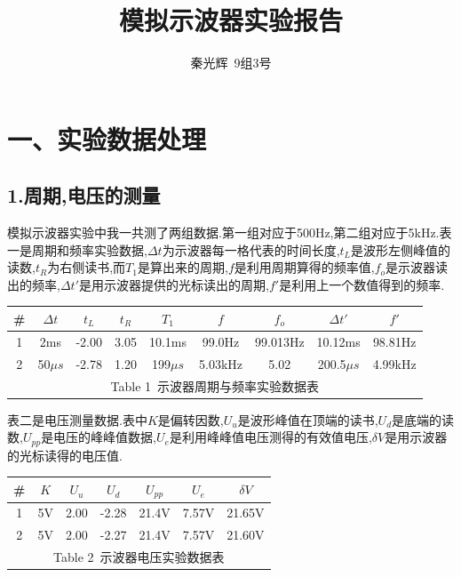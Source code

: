 \documentclass[a4paper,10pt,notitlepage]{report}
\begin{document}
\title{模拟示波器实验报告}
\author{秦光辉\ 9组3号}
\maketitle

\section*{一、实验数据处理}
\subsection*{1.周期,电压的测量}

	模拟示波器实验中我一共测了两组数据.第一组对应于500Hz,第二组对应于5kHz.表一是周期和频率实验数据,$\Delta t$为示波器每一格代表的时间长度,$t_L$是波形左侧峰值的读数,$ t_R $为右侧读书,而$T_1$是算出来的周期,$f$是利用周期算得的频率值,$f_o$是示波器读出的频率,$\Delta t'$是用示波器提供的光标读出的周期,$f'$是利用上一个数值得到的频率. \\
	
\begin{table}[htbp]
\centering
	\begin{tabular}{|c|c|c|c|c|c|c|c|c|}
	
		\hline
		\# & $\Delta t$ & $t_L$ & $ t_R $ & $T_1$ & $f$ & $f_o$ & $\Delta t'$ & $f'$ \\
		\hline
		1 & 2ms & -2.00 & 3.05 & 10.1ms & 99.0Hz & 99.013Hz & 10.12ms & 98.81Hz \\
		\hline
		2 & 50$\mu s$ & -2.78 & 1.20 & 199$\mu s$ & 5.03kHz & 5.02 & 200.5$\mu s$ & 4.99kHz \\
		\hline
		\multicolumn{9}{c}{\scriptsize Table 1\ 示波器周期与频率实验数据表} \\

	\end{tabular}
\end{table}

	表二是电压测量数据.表中$K$是偏转因数,$U_u$是波形峰值在顶端的读书,$U_d$是底端的读数,$U_{pp}$是电压的峰峰值数据,$U_e$是利用峰峰值电压测得的有效值电压,$\delta V$是用示波器的光标读得的电压值. \\

\begin{table}[htbp]
\centering
	\begin{tabular}{|c|c|c|c|c|c|c|}
	
		\hline
		\# & $K$ & $U_u$ & $U_d$ & $U_{pp}$ & $U_e$ & $\delta V$  \\
		\hline
		1 & 5V & 2.00 & -2.28 & 21.4V & 7.57V & 21.65V \\
		\hline
		2 & 5V & 2.00 & -2.27 & 21.4V & 7.57V & 21.60V \\
		\hline
		\multicolumn{7}{c}{\scriptsize Table 2\ 示波器电压实验数据表} \\

	\end{tabular}
\end{table}
\end{document}
